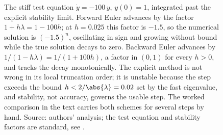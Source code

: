 \begin{figure}[ht]
\begin{tikzpicture}[x=1.1cm, y=2.2cm, font=\footnotesize]
\end{tikzpicture}
\caption[Explicit versus implicit integration of a stiff scalar mode]{The
stiff test equation $\dot y = -100\,y$, $y(0)=1$, integrated past the
explicit stability limit. Forward Euler advances by the factor
$1 + h\lambda = 1 - 100h$; at $h = 0.025$ this factor is $-1.5$, so the
numerical solution is $(-1.5)^{n}$, oscillating in sign and growing without
bound while the true solution decays to zero. Backward Euler advances by
$1/(1 - h\lambda) = 1/(1 + 100h)$, a factor in $(0,1)$ for every $h>0$, and
tracks the decay monotonically. The explicit method is not wrong in its
local truncation order; it is unstable because the step exceeds the bound
$h < 2/\abs{\lambda} = 0.02$ set by the fast eigenvalue, and stability, not
accuracy, governs the usable step. The worked comparison in the text carries
both schemes for several steps by hand. Source: authors' analysis; the
test equation and stability factors are standard, see
\cite[ch.~10]{text:moler-numerical}.}
\label{fig:vol02:ch16:stiff-explicit-implicit}
\end{figure}
